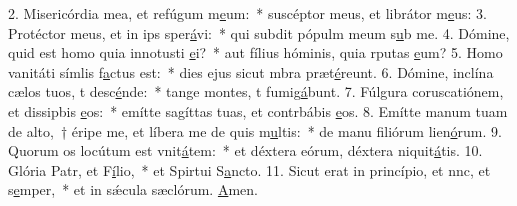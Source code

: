 2. Misericórdia mea, et refúgum m\uline{e}um:~* suscéptor meus, et librátor m\uline{e}us:
3. Protéctor meus, et in ips sper\uline{á}vi:~* qui subdit pópulm meum s\uline{u}b me.
4. Dómine, quid est homo quia innotusti \uline{e}i?~* aut fílius hóminis, quia rputas \uline{e}um?
5. Homo vanitáti símlis f\uline{a}ctus est:~* dies ejus sicut mbra præt\uline{é}reunt.
6. Dómine, inclína cælos tuos, t desc\uline{é}nde:~* tange montes, t fumig\uline{á}bunt.
7. Fúlgura coruscatiónem, et dissipbis \uline{e}os:~* emítte sagíttas tuas, et contrbábis \uline{e}os.
8. Emítte manum tuam de alto,~† éripe me, et líbera me de quis m\uline{u}ltis:~* de manu filiórum lien\uline{ó}rum.
9. Quorum os locútum est vnit\uline{á}tem:~* et déxtera eórum, déxtera niquit\uline{á}tis.
10. Glória Patr, et F\uline{í}lio,~* et Spirtui S\uline{a}ncto.
11. Sicut erat in princípio, et nnc, et s\uline{e}mper,~* et in sǽcula sæclórum. \uline{A}men.
